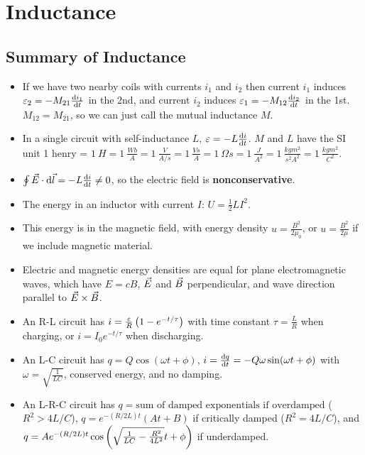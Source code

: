 \chapter{Inductance}

\section{Summary of Inductance}
\begin{itemize}
	\item If we have two nearby coils with currents $i_1$ and $i_2$ then current $i_1$ induces $\varepsilon_2 = -M_{21} \frac{\operatorname{d\!} i_1}{\operatorname{d\!} t}$ in the 2nd, and current $i_2$ induces $\varepsilon_1 = -M_{12} \frac{\operatorname{d\!} i_2}{\operatorname{d\!} t}$ in the 1st. $M_{12} = M_{21}$, so we can just call the mutual inductance $M$.
	
	\item In a single circuit with self-inductance $L$, $\varepsilon = -L\frac{\operatorname{d\!} i}{\operatorname{d\!} t}$. $M$ and $L$ have the SI unit 1 henry = $\SI{1}{H} = \SI{1}{\frac{Wb}{A}} = \SI{1}{\frac{V}{A/s}} = \SI{1}{\frac{Vs}{A}} = \SI{1}{\Omega s} = \SI{1}{\frac{J}{A^2}} = \SI{1}{\frac{kgm^2}{s^2A^2}} = \SI{1}{\frac{kgm^2}{C^2}}$.
	
	\item $\oint \vec{E} \cdot \operatorname{d\!} \vec{l} = -L \frac{\operatorname{d\!} i}{\operatorname{d\!} t} \neq 0$, so the electric field is \textbf{nonconservative}.
	
	\item The energy in an inductor with current $I$: $U = \frac{1}{2} L I^2$.
	
	\item This energy is in the magnetic field, with energy density $u = \frac{B^2}{2\mu_0}$, or $u = \frac{B^2}{2\mu}$ if we include magnetic material.
	
	\item Electric and magnetic energy densities are equal for plane electromagnetic waves, which have $E = cB$, $\vec{E}$ and $\vec{B}$ perpendicular, and wave direction parallel to $\vec{E} \times \vec{B}$.
	
	\item An R-L circuit has $i = \frac{\varepsilon}{R}\left(  1 - e^{-t/\tau}  \right)$ with time constant $\tau = \frac{L}{R}$ when charging, or $i = I_0e^{-t/\tau}$ when discharging.
	
	\item An L-C circuit has $q = Q\cos(\omega t + \phi)$, $i = \frac{\operatorname{d\!} q}{\operatorname{d\!} t} = -Q\omega\sin(\omega t + \phi)$ with $\omega = \sqrt{ \frac{1}{LC} }$, conserved energy, and no damping.
	
	\item An L-R-C circuit has $q = \text{sum of damped exponentials if overdamped}$ ($R^2 > 4L/C$), $q = e^{-(R/2L)t}(At+B)$ if critically damped ($R^2 = 4L/C$), and $q = Ae^{-(R/2L)t}\cos\left(  \sqrt{\frac{1}{LC} - \frac{R^2}{4L^2}}t + \phi  \right)$ if underdamped.
\end{itemize}